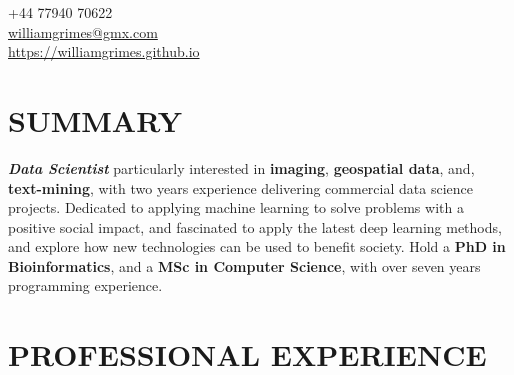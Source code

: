 \documentclass[margin,line]{resume}
\begin{document}
{
    \hfill +44 77940 70622 \ \Mobilefone                                               \vspace{0mm}\\\vspace{0mm}%
    \hfill \href{mailto:williamgrimes@gmx.com}{williamgrimes@gmx.com} \ \Letter        \vspace{0mm}\\\vspace{0mm}%
    \hfill \url{https://williamgrimes.github.io} \                      \ComputerMouse \vspace{0mm}\\\vspace{-10mm}%
}

\begin{resume}

    \vspace{-3mm}

    \section{\mysidestyle \textbf{\large{S}\small{UMMARY}}}

    \textbf{\textsl{Data Scientist}} particularly interested in \textbf{imaging}, \textbf{geospatial data}, and, \textbf{text-mining}, with two years experience delivering commercial data science projects.  Dedicated to applying machine learning to solve problems with a positive social impact, and fascinated to apply the latest deep learning methods, and explore how new technologies can be used to benefit society.  Hold a \textbf{PhD in Bioinformatics}, and a \textbf{MSc in Computer Science}, with over seven years programming experience.  

    \vspace{-1mm}

\sectionline

    \section{\mysidestyle \textbf{\large{P}\small{ROFESSIONAL} \large{E}\small{XPERIENCE}}}


\end{resume}
\end{document}
